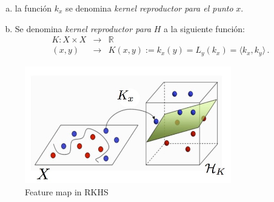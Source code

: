 \begin{enumerate}[(a)]
\begin{myremark}
Si se tiene una sucesi\'on ${f_n}$ en $H$ con:
\begin{equation}\label{eq:cont1}
f_n \rightarrow n\ \text{{\bf ?`n? !`EROR!} para } n \rightarrow \infty 
\Longleftrightarrow ||f_n-f||_H \rightarrow 0, n\rightarrow \infty
\end{equation}
se cumple en que:
\begin{equation*}
|f_n(x) - f(x) | 
= | L_x(f_n-f) | \leq ||L_x|| ||f_n-f|| \rightarrow 0, n\rightarrow \infty
\end{equation*}
Ya sabemos de la ecuaci\'on (\ref{eq:cont1}) que 
$||f_n-f||_H \rightarrow 0$ y se verifica que $||L_x||$ 
al ser cont\'\i nuo est\'a acotado por:
\begin{equation*}
||L_x|| = \sup_{f \in H,f \neq 0} \frac{|L_x(f)|}{||f||}
\end{equation*}
{\bf En realidad lo correcto ser\'\i a decir: si
$||L_x|| = \sup_{f \in H,f \neq 0} \frac{|L_x(f)|}{||f||}<\infty$,
entonces $L_x$ es continuo.}

\smallskip\noindent
(c)\ $f\in H$ es una funci\'on definida como:
\begin{eqnarray*}
f: X &\rightarrow &\mathbb{R} \\
 x &\rightarrow & f(x) 
\end{eqnarray*}
{\bf (c) es correcto pero no aporta nada nuevo.}

\smallskip\noindent
Las lectoras deben corregir estos p\'arrafos hasta darle un sentido
matem\'aticamente correcto, pero no deben ser inclu\'\i dos en la
versi\'on final del documento.
\end{myremark}

\item
la funci\'on $k_x$ se denomina \textit{kernel reproductor para el punto}
$x$. 

\item
Se denomina \textit{kernel reproductor para} $H$ a la siguiente funci\'on:
\begin{eqnarray*}
K: X \times X &\rightarrow &\mathbb{R} \\
(x,y) &\rightarrow & K(x,y):= k_x(y) = L_y(k_x) = \langle k_x,k_y\rangle\,.
\end{eqnarray*}
\end{enumerate}










\begin{figure}[ht!]
\centering
\includegraphics[width=90mm]{img/featuremaphilbert.jpg}
\caption{Feature map in RKHS}
\label{overflow}
\end{figure}

